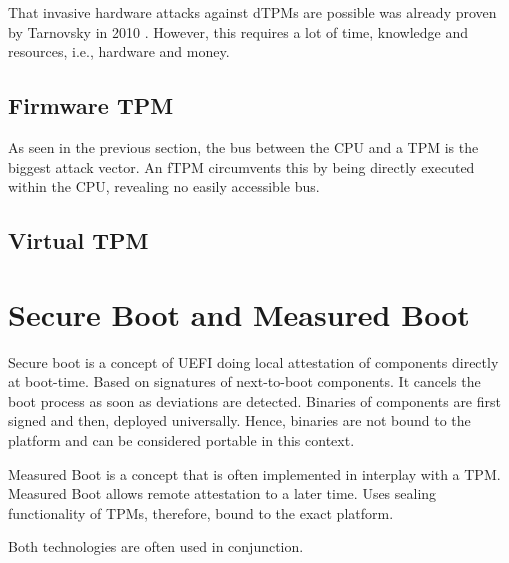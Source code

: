 That invasive hardware attacks against dTPMs are possible was already proven by Tarnovsky in 2010 \cite{tarnovsky}. However, this requires a lot of time, knowledge and resources, i.e., hardware and money.


\subsection{Firmware TPM}

As seen in the previous section, the bus between the CPU and a TPM is the biggest attack vector. An fTPM circumvents this by being directly executed within the CPU, revealing no easily accessible bus.

\subsection{Virtual TPM}



\section{Secure Boot and Measured Boot}

Secure boot is a concept of UEFI doing local attestation of components directly at boot-time. Based on signatures of next-to-boot components. It cancels the boot process as soon as deviations are detected. Binaries of components are first signed and then, deployed universally. Hence, binaries are not bound to the platform and can be considered portable in this context.

Measured Boot is a concept that is often implemented in interplay with a TPM. Measured Boot allows remote attestation to a later time. Uses sealing functionality of TPMs, therefore, bound to the exact platform.

Both technologies are often used in conjunction.
